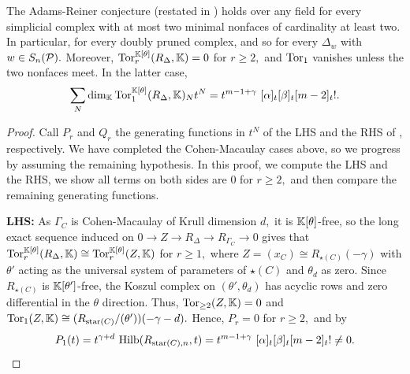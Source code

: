 \begin{theorem}
\label{thm: adams-reiner conj for doubly pruned complexes}
    The Adams-Reiner conjecture (restated in ) holds over any field for every simplicial complex with at most two minimal nonfaces of cardinality at least two. In particular, for every doubly pruned complex, and so for every $\Delta_w$ with $w\in S_n(\mathcal{P}).$ Moreover, $\operatorname{Tor}_r^{\mathbb{K}[\theta]}(R_\Delta,\mathbb{K}) = 0$ for $r\geq 2,$ and $\operatorname{Tor}_1$ vanishes unless the two nonfaces meet. In the latter case,
    \[
    \sum_N
    \dim_{\mathbb{K}} \operatorname{Tor}_1^{\mathbb{K}[\theta]}(R_\Delta,\mathbb{K})_N t^N 
    = t^{m-1+\gamma}~[\alpha]_t[\beta]_t[m-2]_t!.
    \]
\end{theorem}
\begin{proof}
    Call $P_r$ and $Q_r$ the generating functions in $t^N$ of the LHS and the RHS of , respectively. We have completed the Cohen-Macaulay cases above, so we progress by assuming the remaining hypothesis. In this proof, we compute the LHS and the RHS, we show all terms on both sides are $0$ for $r\geq 2,$ and then compare the remaining generating functions. 
    
    \textbf{LHS:} As $\Gamma_C$ is Cohen-Macaulay of Krull dimension $d,$ it is $\mathbb{K}[\theta]$-free, so the long exact sequence induced on $0\rightarrow Z\rightarrow R_\Delta\rightarrow R_{\Gamma_C}\rightarrow 0$ gives that $\operatorname{Tor}_r^{\mathbb{K}[\theta]}(R_\Delta,\mathbb{K})\cong\operatorname{Tor}_r^{\mathbb{K}[\theta]}(Z,\mathbb{K})$ for $r\geq 1,$ where $Z = (x_C)\cong R_{\star(C)}(-\gamma)$ with $\theta'$ acting as the universal system of parameters of $\star(C)$ and $\theta_d$ as zero. 
    Since $R_{\star(C)}$ is $\mathbb{K}[\theta']$-free, the Koszul complex on $(\theta',\theta_d)$ has acyclic rows and zero differential in the $\theta$ direction. Thus, $\operatorname{Tor}_{\geq 2}(Z,\mathbb{K}) = 0$ and $\operatorname{Tor}_1(Z,\mathbb{K})\cong (R_{\mathrm{star}(C)}/(\theta'))(-\gamma-d).$
    Hence, $P_r = 0$ for $r\geq 2,$ and by 
    \begin{equation}
        P_1(t) = t^{\gamma+d}~\mathrm{Hilb}(R_{\mathrm{star}(C),n},t) = t^{m-1+\gamma}~[\alpha]_t[\beta]_t[m-2]_t!\neq 0.
    \end{equation}


\end{proof}
